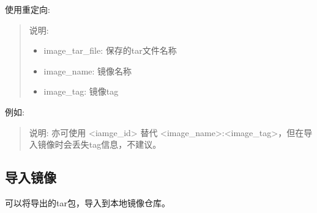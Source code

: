\documentclass[letterpaper,10pt,english]{sphinxmanual}
\begin{document}
使用重定向:

\begin{sphinxVerbatim}[commandchars=\\\{\}]
     
\end{sphinxVerbatim}
\begin{quote}

说明:
\begin{itemize}
\item {} 
image\_tar\_file: 保存的tar文件名称

\item {} 
image\_name: 镜像名称

\item {} 
image\_tag: 镜像tag

\end{itemize}
\end{quote}

例如:

\begin{sphinxVerbatim}[commandchars=\\\{\}]
     
     
\end{sphinxVerbatim}
\begin{quote}

说明: 亦可使用 \textless{}iamge\_id\textgreater{} 替代 \textless{}image\_name\textgreater{}:\textless{}image\_tag\textgreater{}，但在导入镜像时会丢失tag信息，不建议。
\end{quote}


\subsection{导入镜像}
\label{\detokenize{docker/basic_cmd:id10}}
可以将导出的tar包，导入到本地镜像仓库。

\begin{sphinxVerbatim}[commandchars=\\\{\}]
    
\end{sphinxVerbatim}
\end{document}
